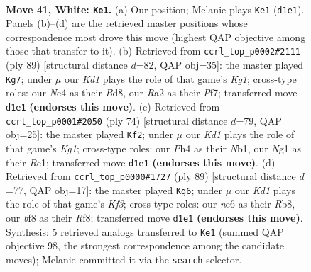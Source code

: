 \documentclass[11pt]{article}
\begin{document}
\clearpage

\begin{figure}[p]\centering
\begin{subfigure}{0.46\textwidth}\centering
\resizebox{\linewidth}{!}{%
\newchessgame
\chessboard[
  setfen={3r1b2/3kn2r/4n1p1/7p/P3N2P/6R1/R5P1/3K2N1 w - - 0 41},
  showmover=false,
  pgfstyle=straightmove, color=movearrow, markmove={d1-e1}
]}
\caption{}
\end{subfigure}\hfill
\begin{subfigure}{0.46\textwidth}\centering
\resizebox{\linewidth}{!}{%
\newchessgame
\chessboard[
  setfen={2rb2k1/5p2/6p1/1PP3r1/2R5/4N2p/4KP2/1R6 b - - 1 45},
  showmover=false,
  pgfstyle=straightmove, color=movearrow, markmove={g8-g7}
]}
\caption{}
\end{subfigure}
\\[4pt]
\begin{subfigure}{0.46\textwidth}\centering
\resizebox{\linewidth}{!}{%
\newchessgame
\chessboard[
  setfen={8/p3rk2/P3n3/2p3P1/1p3P1R/3r4/6P1/1NR3K1 w - - 3 38},
  showmover=false,
  pgfstyle=straightmove, color=movearrow, markmove={g1-f2}
]}
\caption{}
\end{subfigure}\hfill
\begin{subfigure}{0.46\textwidth}\centering
\resizebox{\linewidth}{!}{%
\newchessgame
\chessboard[
  setfen={1r3r2/2R4R/5k2/4p2p/1p2P3/1P6/2P2nP1/1KN5 b - - 19 45},
  showmover=false,
  pgfstyle=straightmove, color=movearrow, markmove={f6-g6}
]}
\caption{}
\end{subfigure}
\caption{\textbf{Move 41, White: \texttt{Ke1}.} (a) Our position; Melanie plays \texttt{Ke1} (\texttt{d1e1}). Panels (b)--(d) are the retrieved master positions whose correspondence most drove this move (highest QAP objective among those that transfer to it). (b) Retrieved from \texttt{ccrl\_top\_p0002\#2111} (ply 89) [structural distance $d$=82, QAP obj=35]: the master played \texttt{Kg7}; under $\mu$ our \emph{Kd1} plays the role of that game's \emph{Kg1}; cross-type roles: our \emph{N}e4 as their \emph{B}d8, our \emph{R}a2 as their \emph{P}f7; transferred move \texttt{d1e1} \textbf{(endorses this move)}. (c) Retrieved from \texttt{ccrl\_top\_p0001\#2050} (ply 74) [structural distance $d$=79, QAP obj=25]: the master played \texttt{Kf2}; under $\mu$ our \emph{Kd1} plays the role of that game's \emph{Kg1}; cross-type roles: our \emph{P}h4 as their \emph{N}b1, our \emph{N}g1 as their \emph{R}c1; transferred move \texttt{d1e1} \textbf{(endorses this move)}. (d) Retrieved from \texttt{ccrl\_top\_p0000\#1727} (ply 89) [structural distance $d$=77, QAP obj=17]: the master played \texttt{Kg6}; under $\mu$ our \emph{Kd1} plays the role of that game's \emph{Kf3}; cross-type roles: our \emph{n}e6 as their \emph{R}b8, our \emph{b}f8 as their \emph{R}f8; transferred move \texttt{d1e1} \textbf{(endorses this move)}. Synthesis: 5 retrieved analogs transferred to \texttt{Ke1} (summed QAP objective 98, the strongest correspondence among the candidate moves); Melanie committed it via the \texttt{search} selector.}
\label{fig:thought-m80}
\end{figure}
\end{document}
